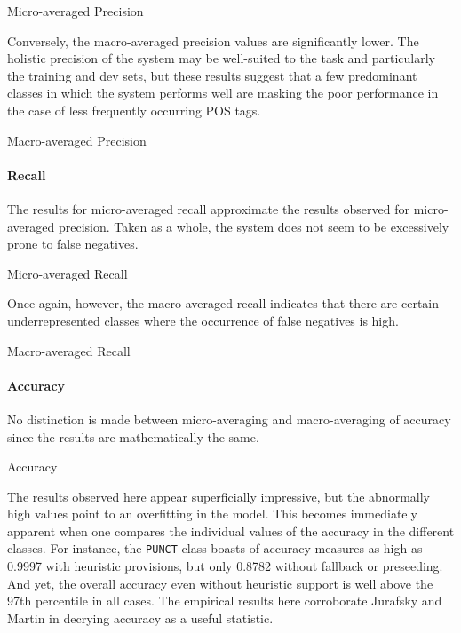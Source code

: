 \documentclass[11pt,a4paper]{article}
\begin{document}
{\center\footnotesize Micro-averaged Precision\\}
{\tiny\pgfplotstabletypeset[header=true]{\pmicro}}

Conversely, the macro-averaged precision values are significantly lower.
The holistic precision of the system may be well-suited to the task
and particularly the training and dev sets, but these results suggest
that a few predominant classes in which the system performs well
are masking the poor performance in the case of less frequently occurring
POS tags.

{\center\footnotesize Macro-averaged Precision\\}
{\tiny\pgfplotstabletypeset[header=true]{\pmacro}}

\paragraph{Recall}
The results for micro-averaged recall approximate the
results observed for micro-averaged precision. Taken as a
whole, the system does not seem to be excessively prone to
false negatives.


{\center\footnotesize Micro-averaged Recall\\}
{\tiny\pgfplotstabletypeset[header=true]{\rmicro}}

Once again, however, the macro-averaged recall indicates
that there are certain underrepresented classes where the
occurrence of false negatives is high.

{\center\footnotesize Macro-averaged Recall\\}
{\tiny\pgfplotstabletypeset[header=true]{\rmacro}}

\paragraph{Accuracy}
No distinction is made between micro-averaging and macro-averaging
of accuracy since the results are mathematically the same.

{\center\footnotesize Accuracy\\}
{\tiny\pgfplotstabletypeset[header=true]{\amicro}}

The results observed here appear superficially impressive,
but the abnormally high values point to an overfitting in the model.
This becomes immediately apparent when one compares the individual
values of the accuracy in the different classes. For instance,
the \texttt{PUNCT} class boasts of accuracy measures as high
as 0.9997 with heuristic provisions, but only 0.8782 without
fallback or preseeding. And yet, the overall accuracy even without
heuristic support is well above the 97th percentile in all cases.
The empirical results here corroborate Jurafsky and Martin 
in decrying accuracy as a useful statistic.
\end{document}
